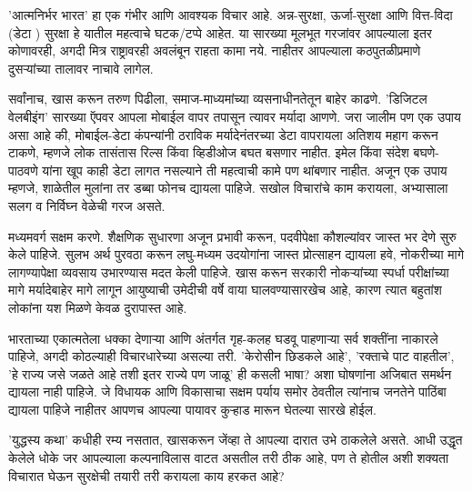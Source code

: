 'आत्मनिर्भर भारत' हा एक गंभीर आणि आवश्यक विचार आहे. अन्न-सुरक्षा, ऊर्जा-सुरक्षा आणि वित्त-विदा (डेटा ) सुरक्षा हे यातील महत्वाचे घटक/टप्पे आहेत. या सारख्या मूलभूत गरजांवर आपल्याला इतर कोणावरही, अगदी मित्र राष्ट्रावरही अवलंबून राहता कामा नये. नाहीतर आपल्याला कठपुतळीप्रमाणे दुसऱ्यांच्या तालावर नाचावे लागेल.

सर्वांनाच, खास करून तरुण पिढीला, समाज-माध्यमांच्या व्यसनाधीनतेतून बाहेर काढणे. 'डिजिटल वेलबीइंग' सारख्या ऍपवर आपला मोबाईल वापर तपासून त्यावर मर्यादा आणणे. जरा जालीम पण एक उपाय असा आहे की, मोबाईल-डेटा कंपन्यांनी ठराविक मर्यादेनंतरच्या डेटा वापरायला अतिशय महाग करून टाकणे, म्हणजे लोक तासंतास रिल्स किंवा व्हिडीओज बघत बसणार नाहीत. इमेल किंवा संदेश बघणे-पाठवणे यांना खूप काही डेटा लागत नसल्याने ती महत्वाची कामे पण थांबणार नाहीत. अजून एक उपाय म्हणजे, शाळेतील मुलांना तर डब्बा फोनच द्यायला पाहिजे. सखोल विचारांचे काम करायला, अभ्यासाला सलग व निर्विघ्न वेळेची गरज असते.

मध्यमवर्ग सक्षम करणे. शैक्षणिक सुधारणा अजून प्रभावी करून, पदवीपेक्षा कौशल्यांवर जास्त भर देणे सुरु केले पाहिजे. सुलभ अर्थ पुरवठा करून लघु-मध्यम उदयोगांना जास्त प्रोत्साहन द्यायला हवे, नोकरीच्या मागे लागण्यापेक्षा व्यवसाय उभारण्यास मदत केली पाहिजे. खास करून सरकारी नोकऱ्यांच्या स्पर्धा परीक्षांच्या मागे मर्यादेबाहेर मागे लागून आयुष्याची उमेदीची वर्षे वाया घालवण्यासारखेच आहे, कारण त्यात बहुतांश लोकांना यश मिळणे केवळ दुरापास्त आहे.

भारताच्या एकात्मतेला धक्का देणाऱ्या आणि अंतर्गत गृह-कलह घडवू पाहणाऱ्या सर्व शक्तींना नाकारले पाहिजे, अगदी कोठल्याही विचारधारेच्या असल्या तरी. 'केरोसीन छिडकले आहे', 'रक्ताचे पाट वाहतील', 'हे राज्य जसे जळते आहे तशी इतर राज्ये पण जाळू' ही कसली भाषा? अशा घोषणांना अजिबात समर्थन द्यायला नाही पाहिजे. जे विधायक आणि विकासाचा सक्षम पर्याय समोर ठेवतील त्यांनाच जनतेने पाठिंबा द्यायला पाहिजे नाहीतर आपणच आपल्या पायावर कुऱ्हाड मारून घेतल्या सारखे होईल.

'युद्धस्य कथा' कधीही रम्य नसतात, खासकरून जेंव्हा ते आपल्या दारात उभे ठाकलेले असते. आधी उद्धृत केलेले धोके जर आपल्याला कल्पनाविलास वाटत असतील तरी ठीक आहे, पण ते होतील अशी शक्यता विचारात घेऊन सुरक्षेची तयारी तरी करायला काय हरकत आहे?